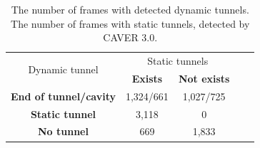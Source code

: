 \documentclass[usletter, 10pt, conference]{svjour3}      %
\begin{document}
\begin{table}
\centering
\caption{\label{tab::dyn} The number of frames with detected dynamic tunnels. The number of frames
    with static tunnels, detected by CAVER 3.0.
}
\begin{tabular}{ccccc}
\toprule
  \multirow{2}{*}{ Dynamic tunnel}   &  \multicolumn{2}{c}{ Static tunnels}   \\
                                     &  {\bf Exists} & {\bf Not exists} \\
\midrule                                     
{\bf End of tunnel/cavity}           & 1,324/661 & 1,027/725  \\
{\bf Static tunnel}                  & 3,118     &  0   \\
{\bf No tunnel}                      & 669      & 1,833    \\ 
\bottomrule                                 
\end{tabular}
\end{table}
\end{document}
